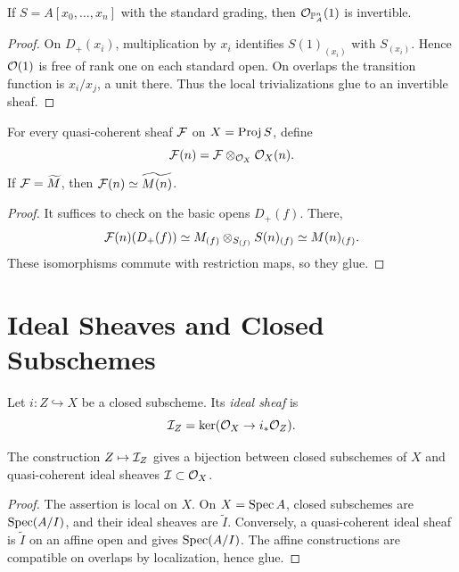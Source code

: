 \begin{proposition}
If \(S=A[x_0,\ldots,x_n]\) with the standard grading, then
\(\mathcal{O}_{\mathbb{P}^n_A}(1)\) is invertible.
\end{proposition}

\begin{proof}
On \(D_+(x_i)\), multiplication by \(x_i\) identifies \(S(1)_{(x_i)}\) with
\(S_{(x_i)}\).  Hence \(\mathcal{O}(1)\) is free of rank one on each standard open.
On overlaps the transition function is \(x_i/x_j\), a unit there.  Thus the
local trivializations glue to an invertible sheaf.
\end{proof}

\begin{proposition}
For every quasi-coherent sheaf \(\mathcal{F}\) on \(X=\operatorname{Proj} S\), define
\[
    \mathcal{F}(n)=\mathcal{F}\otimes_{\mathcal{O}_X}\mathcal{O}_X(n).
\]
If \(\mathcal{F}=\widetilde M\), then \(\mathcal{F}(n)\simeq\widetilde{M(n)}\).
\end{proposition}

\begin{proof}
It suffices to check on the basic opens \(D_+(f)\).  There,
\[
    \mathcal{F}(n)(D_+(f))
    \simeq
    M_{(f)}\otimes_{S_{(f)}} S(n)_{(f)}
    \simeq
    M(n)_{(f)}.
\]
These isomorphisms commute with restriction maps, so they glue.
\end{proof}

\section{Ideal Sheaves and Closed Subschemes}

\begin{definition}
Let \(i:Z\hookrightarrow X\) be a closed subscheme.  Its \emph{ideal sheaf} is
\[
    \mathcal{I}_Z=\ker(\mathcal{O}_X\to i_*\mathcal{O}_Z).
\]
\end{definition}

\begin{proposition}
The construction \(Z\mapsto\mathcal{I}_Z\) gives a bijection between closed subschemes
of \(X\) and quasi-coherent ideal sheaves \(\mathcal{I}\subset\mathcal{O}_X\).
\end{proposition}

\begin{proof}
The assertion is local on \(X\).  On \(X=\operatorname{Spec} A\), closed subschemes are
\(\operatorname{Spec}(A/I)\), and their ideal sheaves are \(\widetilde I\).  Conversely, a
quasi-coherent ideal sheaf is \(\widetilde I\) on an affine open and gives
\(\operatorname{Spec}(A/I)\).  The affine constructions are compatible on overlaps by
localization, hence glue.
\end{proof}

